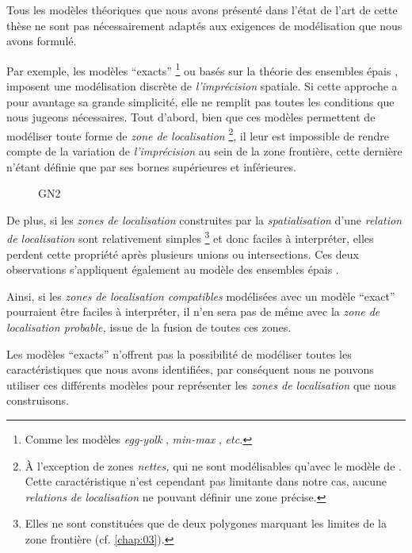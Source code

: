 Tous les modèles théoriques que nous avons présenté dans l'état de
l'art de cette thèse ne sont pas nécessairement adaptés aux exigences
de modélisation que nous avons formulé.

%
Par exemple, les modèles \enquote{exacts} \footnote{Comme les modèles
  \emph{egg-yolk} \autocite{Cohn1996}, \emph{min-max}
  \autocite{Clementini1996}, \emph{etc.}} ou basés sur la théorie des
ensembles épais \autocite{Pawlak1982}, imposent une modélisation
discrète de \emph{l'imprécision} spatiale. Si cette approche a pour
avantage sa grande simplicité, elle ne remplit pas toutes les
conditions que nous jugeons nécessaires. Tout d'abord, bien que ces
modèles permettent de modéliser toute forme de \emph{zone de
  localisation} \footnote{À l'exception de zones \emph{nettes,} qui ne
  sont modélisables qu'avec le modèle de \textcite{Bejaoui2009}. Cette
  caractéristique n'est cependant pas limitante dans notre cas, aucune
  \emph{relations de localisation} ne pouvant définir une zone
  précise.}, il leur est impossible de rendre compte de la variation
de \emph{l'imprécision} au sein de la zone frontière, cette dernière
n'étant définie que par ses bornes supérieures et inférieures.


\begin{figure}
  \centering
  
  \caption{GN2}
\end{figure}


De plus, si les \emph{zones de localisation} construites par la
\emph{spatialisation} d'une \emph{relation de localisation} sont
relativement simples \footnote{Elles ne sont constituées que de deux
  polygones marquant les limites de la zone frontière
  (cf. \autoref{chap:03}).} et donc faciles à interpréter, elles
perdent cette propriété après plusieurs unions ou intersections.
%
Ces deux observations s'appliquent également au modèle des ensembles
épais \autocite{Pawlak1982}.

%
Ainsi, si les \emph{zones de localisation compatibles} modélisées avec
un modèle \enquote{exact} pourraient être faciles à interpréter, il
n'en sera pas de même avec la \emph{zone de localisation probable,}
issue de la fusion de toutes ces zones.

Les modèles \enquote{exacts} n'offrent pas la possibilité de modéliser
toutes les caractéristiques que nous avons identifiées, par conséquent
nous ne pouvons utiliser ces différents modèles pour représenter les
\emph{zones de localisation} que nous construisons.

